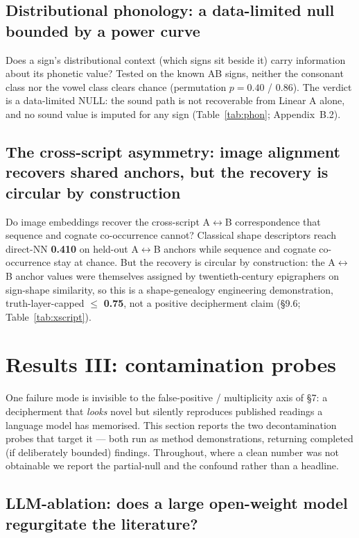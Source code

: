 \subsection{Distributional phonology: a data-limited null bounded by a
power curve}

Does a sign's distributional context (which signs sit beside it) carry
information about its phonetic value? Tested on the known AB signs, neither
the consonant class nor the vowel class clears chance (permutation
$p = 0.40$ / $0.86$). The verdict is a data-limited NULL: the sound path is
not recoverable from Linear A alone, and no sound value is imputed for any
sign (Table~\ref{tab:phon}; Appendix~B.2).

\subsection{The cross-script asymmetry: image alignment recovers shared
anchors, but the recovery is circular by construction}

Do image embeddings recover the cross-script A$\leftrightarrow$B
correspondence that sequence and cognate co-occurrence cannot? Classical
shape descriptors reach direct-NN \textbf{0.410} on held-out
A$\leftrightarrow$B anchors while sequence and cognate co-occurrence stay
at chance. But the recovery is circular by construction: the
A$\leftrightarrow$B anchor values were themselves assigned by
twentieth-century epigraphers on sign-shape similarity, so this is a
shape-genealogy engineering demonstration, truth-layer-capped $\le$
\textbf{0.75}, not a positive decipherment claim (\S9.6;
Table~\ref{tab:xscript}).

\section{Results III: contamination probes}

One failure mode is invisible to the false-positive / multiplicity axis of
\S7: a decipherment that \emph{looks} novel but silently reproduces
published readings a language model has memorised. This section reports the
two decontamination probes that target it --- both run as method
demonstrations, returning completed (if deliberately bounded) findings.
Throughout, where a clean number was not obtainable we report the
partial-null and the confound rather than a headline.

\subsection{LLM-ablation: does a large open-weight model regurgitate the
literature?}

